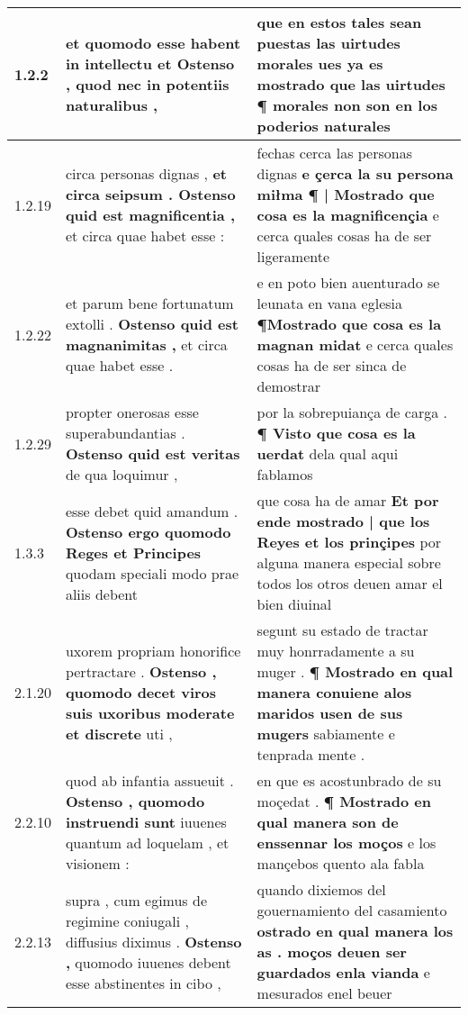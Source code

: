 \begin{tabular}{|p{1cm}|p{6.5cm}|p{6.5cm}|}

\hline
1.2.2 & et quomodo esse habent in intellectu et \textbf{ Ostenso , } quod nec in potentiis naturalibus , & que en estos tales sean puestas las uirtudes morales \textbf{ ues ya es mostrado } que las uirtudes ¶ morales non son en los poderios naturales \\\hline
1.2.19 & circa personas dignas , \textbf{ et circa seipsum . Ostenso quid est magnificentia , } et circa quae habet esse : & fechas cerca las personas dignas \textbf{ e çerca la su persona miłma ¶ | Mostrado que cosa es la magnificençia } e cerca quales cosas ha de ser ligeramente \\\hline
1.2.22 & et parum bene fortunatum extolli . \textbf{ Ostenso quid est magnanimitas , } et circa quae habet esse . & e en poto bien auenturado se leunata en vana eglesia \textbf{ ¶Mostrado que cosa es la magnan midat } e cerca quales cosas ha de ser sinca de demostrar \\\hline
1.2.29 & propter onerosas esse superabundantias . \textbf{ Ostenso quid est veritas } de qua loquimur , & por la sobrepuiança de carga . \textbf{ ¶ Visto que cosa es la uerdat } dela qual aqui fablamos \\\hline
1.3.3 & esse debet quid amandum . \textbf{ Ostenso ergo quomodo Reges et Principes } quodam speciali modo prae aliis debent & que cosa ha de amar \textbf{ Et por ende mostrado | que los Reyes et los prinçipes } por alguna manera especial sobre todos los otros deuen amar el bien diuinal \\\hline
2.1.20 & uxorem propriam honorifice pertractare . \textbf{ Ostenso , quomodo decet viros suis uxoribus moderate et discrete } uti , & segunt su estado de tractar muy honrradamente a su muger . \textbf{ ¶ Mostrado en qual manera conuiene alos maridos usen de sus mugers } sabiamente e tenprada mente . \\\hline
2.2.10 & quod ab infantia assueuit . \textbf{ Ostenso , quomodo instruendi sunt } iuuenes quantum ad loquelam , et visionem : & en que es acostunbrado de su moçedat . \textbf{ ¶ Mostrado en qual manera son de enssennar los moços } e los mançebos quento ala fabla \\\hline
2.2.13 & supra , cum egimus de regimine coniugali , diffusius diximus . \textbf{ Ostenso , } quomodo iuuenes debent esse abstinentes in cibo , & quando dixiemos del gouernamiento del casamiento \textbf{ ostrado en qual manera los as . moços deuen ser guardados enla vianda } e mesurados enel beuer \\\hline

\end{tabular}
